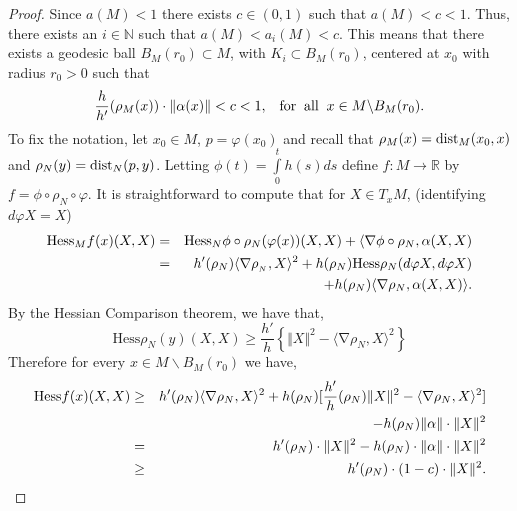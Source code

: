 \documentclass[a4paper]{amsart}
\theoremstyle{definition}
\numberwithin{equation}{section}
\begin{document}
\begin{proof}
Since $a(M)< 1$ there exists $c\in (0,1)$ such that $a(M)< c<1$. Thus, there exists an
 $i\in \mathbb{N}$ such that $a(M)<a_i(M)<c$. This means that there
exists a  geodesic ball $B_{M}(r_0)\subset M$, with $K_i \subset
B_{M}(r_0)$, centered at $x_0$ with radius $r_0 > 0$ such that
\begin{equation}
\displaystyle \frac {h}{h'}(\rho_M
(x))\cdot\Vert \alpha(x)\Vert< c <1,\;\;\;
 {\rm for \;\; all}\;\; x \in M \backslash B_{M}(r_0).
\end{equation}
To fix the notation,  let $x_{0}\in M$, $p=\varphi (x_{0})$ and recall that $\rho_{M}(x)={\rm dist}_{M}(x_{0},x)$ and $\rho_{N}(y)={\rm dist}_{N}(p,y)$. Letting $\phi(t)=\int\limits_{0}^{t}h(s)ds$ define $f\colon M \to \mathbb{R}$ by $f=\phi\circ \rho_{N}\circ \varphi$.  It is straightforward to compute that for $X\in T_{x}M$, (identifying $d\varphi X=X$)
\begin{eqnarray}
{\textrm{Hess}}_{M} f(x)(X,X)&=& {\textrm{Hess}}_{N}\phi\circ \rho_{N}(\varphi(x))( X, X) + \langle{\rm{\operatorname{\nabla}}}\phi\circ\rho_{N},\alpha(X,X)\nonumber\\
&=& h'(\rho_{N})\langle{\rm{\operatorname{\nabla}}}\rho_{_N},X\rangle^2 +h(\rho_{N})
{\rm{\textrm{Hess}}}\rho_{N}(d\varphi X,d\varphi X)\\
&&  
+h(\rho_{N})\langle{\rm{\operatorname{\nabla}}}\rho_{N},\alpha(X,X)\rangle.\nonumber
\end{eqnarray}
By the Hessian Comparison theorem, we have that, 
\begin{equation}
{\textrm{Hess}}\rho_{N}(y)( X,X) \geq \displaystyle
 \frac{h'}{h}\left\{\Vert  X\Vert^2-\langle {\operatorname{\nabla}} \rho_{N},X\rangle^{2}\right\}
\end{equation} Therefore
for every $x \in M \backslash B_{M}(r_0)$ we have,
\begin{eqnarray}\label{eqf}
{\rm{\textrm{Hess}}} f(x)(X,X) &\geq&  h'(\rho_{N})\langle {\operatorname{\nabla}} \rho_{N}, X\rangle^2 +h(\rho_{N})[
\displaystyle \frac{h'}{h}(\rho_{N})\Vert X\Vert^2-\langle {\operatorname{\nabla}} \rho_{N},X\rangle^{2}]\nonumber \\ && -h(\rho_{N})\Vert \alpha\Vert\cdot\Vert X\Vert^2\nonumber \\
&=& h'(\rho_{N})\cdot\Vert X\Vert^2-h(\rho_{N})\cdot\Vert \alpha\Vert\cdot\Vert X\Vert^2 \\
&\geq& 
 h'(\rho_{N})\cdot(1-c)\cdot\Vert X\Vert^2.\nonumber
\end{eqnarray}


\end{proof}
\end{document}
